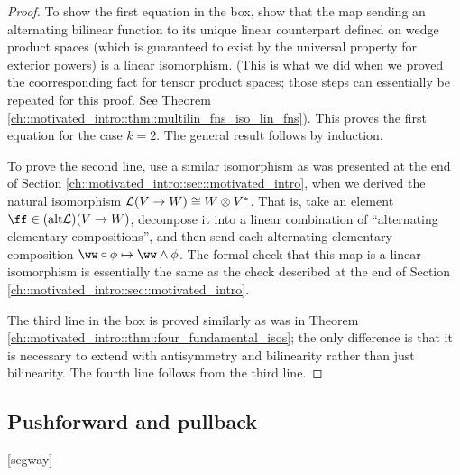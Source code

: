 \begin{proof}
     To show the first equation in the box, show that the map sending an alternating bilinear function to its unique linear counterpart defined on wedge product spaces (which is guaranteed to exist by the universal property for exterior powers) is a linear isomorphism. (This is what we did when we proved the coorresponding fact for tensor product spaces; those steps can essentially be repeated for this proof. See Theorem \ref{ch::motivated_intro::thm::multilin_fns_iso_lin_fns}). This proves the first equation for the case $k = 2$. The general result follows by induction.  
     
    To prove the second line, use a similar isomorphism as was presented at the end of Section \ref{ch::motivated_intro::sec::motivated_intro}, when we derived the natural isomorphism $\mathcal{L}(V \rightarrow W) \cong W \otimes V^*$. That is, take an element $\ff \in (\alt \LLLL)(V \rightarrow W)$, decompose it into a linear combination of ``alternating elementary compositions'', and then send each alternating elementary composition $\ww \circ \phi \mapsto \ww \wedge \phi$. The formal check that this map is a linear isomorphism is essentially the same as the check described at the end of Section \ref{ch::motivated_intro::sec::motivated_intro}.
    
    The third line in the box is proved similarly as was in Theorem \ref{ch::motivated_intro::thm::four_fundamental_isos}; the only difference is that it is necessary to extend with antisymmetry and bilinearity rather than just bilinearity. The fourth line follows from the third line.
    
\end{proof}

\newpage

\subsection*{Pushforward and pullback}

[segway]

